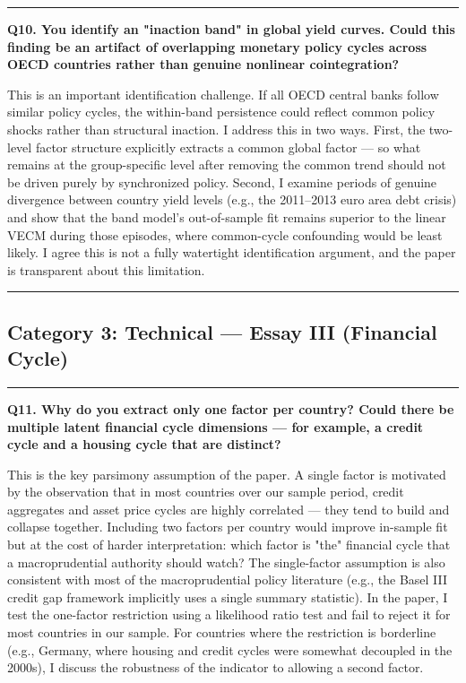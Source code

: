 \documentclass[11pt,a4paper]{article}
\begin{document}
\medskip\hrule\medskip

\textbf{Q10. You identify an "inaction band" in global yield curves. Could this finding be an artifact of overlapping monetary policy cycles across OECD countries rather than genuine nonlinear cointegration?}

This is an important identification challenge. If all OECD central banks follow similar policy cycles, the within-band persistence could reflect common policy shocks rather than structural inaction. I address this in two ways. First, the two-level factor structure explicitly extracts a common global factor — so what remains at the group-specific level after removing the common trend should not be driven purely by synchronized policy. Second, I examine periods of genuine divergence between country yield levels (e.g., the 2011--2013 euro area debt crisis) and show that the band model's out-of-sample fit remains superior to the linear VECM during those episodes, where common-cycle confounding would be least likely. I agree this is not a fully watertight identification argument, and the paper is transparent about this limitation.

\medskip\hrule\medskip

\subsection*{Category 3: Technical — Essay III (Financial Cycle)}

\medskip\hrule\medskip

\textbf{Q11. Why do you extract only one factor per country? Could there be multiple latent financial cycle dimensions — for example, a credit cycle and a housing cycle that are distinct?}

This is the key parsimony assumption of the paper. A single factor is motivated by the observation that in most countries over our sample period, credit aggregates and asset price cycles are highly correlated — they tend to build and collapse together. Including two factors per country would improve in-sample fit but at the cost of harder interpretation: which factor is "the" financial cycle that a macroprudential authority should watch? The single-factor assumption is also consistent with most of the macroprudential policy literature (e.g., the Basel III credit gap framework implicitly uses a single summary statistic). In the paper, I test the one-factor restriction using a likelihood ratio test and fail to reject it for most countries in our sample. For countries where the restriction is borderline (e.g., Germany, where housing and credit cycles were somewhat decoupled in the 2000s), I discuss the robustness of the indicator to allowing a second factor.
\end{document}
